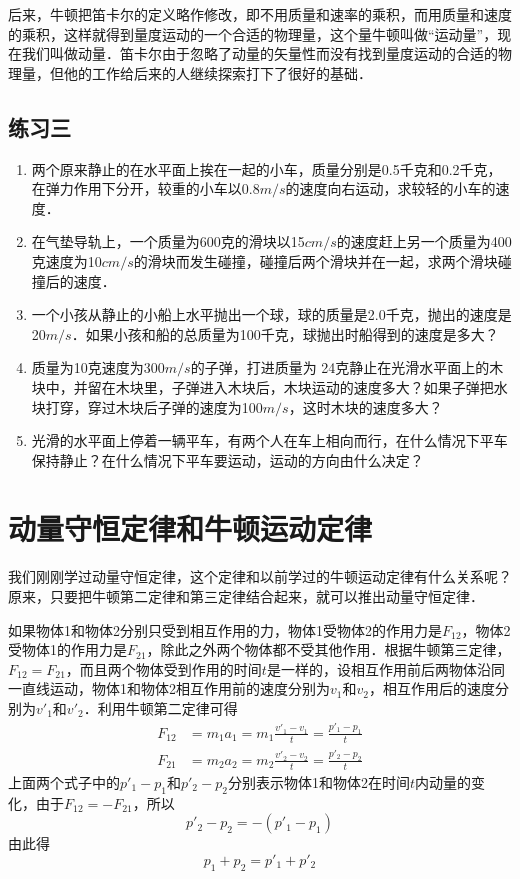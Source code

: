 后来，牛顿把笛卡尔的定义略作修改，即不用质量和速率的乘积，而用质量和速度的乘积，这样就得到量度运动的一个合适的物理量，这个量牛顿叫做“运动量”，现在我们叫做动量．笛卡尔由于忽略了动量的矢量性而没有找到量度运动的合适的物理量，但他的工作给后来的人继续探索打下了很好的基础．
\subsection*{练习三}
\begin{enumerate}
    \item 两个原来静止的在水平面上挨在一起的小车，质量分别是0.5千克和0.2千克，在弹力作用下分开，较重的小车以0.8$\si{m/s}$的速度向右运动，求较轻的小车的速度．
    \item 在气垫导轨上，一个质量为600克的滑块以15${ cm}/{ s}$的速度赶上另一个质量为400克速度为10${ cm}/{ s}$的滑块而发生碰撞，碰撞后两个滑块并在一起，求两个滑块碰撞后的速度．
    \item 一个小孩从静止的小船上水平抛出一个球，球的质量是2.0千克，抛出的速度是20$\si{m/s}$．如果小孩和船的总质量为100千克，球抛出时船得到的速度是多大？
    \item 质量为10克速度为300$\si{m/s}$的子弹，打进质量为
          24克静止在光滑水平面上的木块中，并留在木块里，子弹进入木块后，木块运动的速度多大？如果子弹把水块打穿，穿过木块后子弹的速度为100$\si{m/s}$，这时木块的速度多大？
    \item 光滑的水平面上停着一辆平车，有两个人在车上相向而行，在什么情况下平车保持静止？在什么情况下平车要运动，运动的方向由什么决定？
\end{enumerate}
\newpage
\section{动量守恒定律和牛顿运动定律}
我们刚刚学过动量守恒定律，这个定律和以前学过的牛顿运动定律有什么关系呢？原来，只要把牛顿第二定律和第三定律结合起来，就可以推出动量守恒定律．

如果物体1和物体2分别只受到相互作用的力，物体1受物体2的作用力是$F_{12}$，物体2受物体1的作用力是$F_{21}$，除此之外两个物体都不受其他作用．根据牛顿第三定律，$F_{12}=F_{21}$，而且两个物体受到作用的时间$t$是一样的，设相互作用前后两物体沿同一直线运动，物体1和物体2相互作用前的速度分别为$v_1$和$v_2$，相互作用后的速度分别为$v'_1$和$v'_2$．利用牛顿第二定律可得
\[\begin{split}
        F_{12} & =m_1a_1=m_1\frac{v'_1-v_1}{t}=\frac{p'_1-p_1}{t} \\
        F_{21} & =m_2a_2=m_2\frac{v'_2-v_2}{t}=\frac{p'_2-p_2}{t}
    \end{split}\]
上面两个式子中的$p'_1-p_1$和$p'_2-p_2$分别表示物体1和物体2在时间$t$内动量的变化，由于$F_{12}=-F_{21}$，所以
\[p'_2-p_2=- (p'_1-p_1)\]
由此得
\[p_1+p_2=p'_1+p'_2\]

